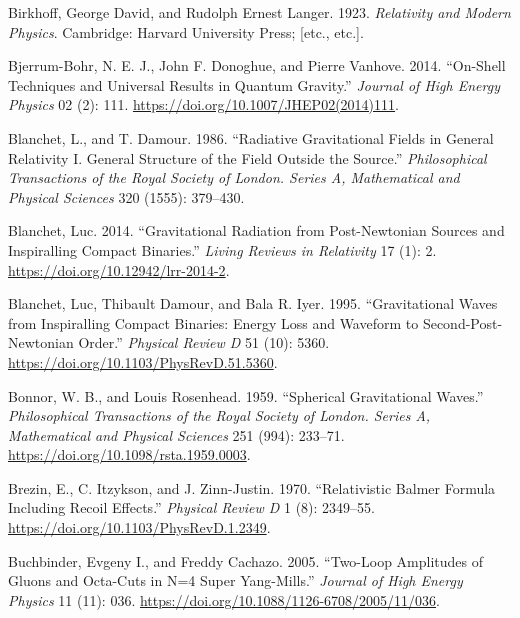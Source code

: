 \documentclass[
  11pt,
  a4paper,
  DIV=11,
  numbers=noendperiod,
  oneside]{scrreprt}
\newlength{\cslhangindent}
\newlength{\cslentryspacingunit} %
\newenvironment{CSLReferences}[2] %
 {%
  \setlength{\parindent}{0pt}
  \ifodd #1
  \let\oldpar\par
  \def\par{\hangindent=\cslhangindent\oldpar}
  \fi
  \setlength{\parskip}{#2\cslentryspacingunit}
 }%
 {}
\DeclareRobustCommand{\[}{\begin{equation}}
\DeclareRobustCommand{\]}{\end{equation}}
\begin{document}
\begin{CSLReferences}{1}{0}
\leavevmode{}%
Birkhoff, George David, and Rudolph Ernest Langer. 1923.
\emph{Relativity and Modern Physics}. {Cambridge}: {Harvard University
Press; {[}etc., etc.{]}}.

\leavevmode{}%
Bjerrum-Bohr, N. E. J., John F. Donoghue, and Pierre Vanhove. 2014.
{``On-Shell Techniques and Universal Results in Quantum Gravity.''}
\emph{Journal of High Energy Physics} 02 (2): 111.
\url{https://doi.org/10.1007/JHEP02(2014)111}.

\leavevmode{}%
Blanchet, L., and T. Damour. 1986. {``Radiative {Gravitational Fields}
in {General Relativity I}. {General Structure} of the {Field} Outside
the {Source}.''} \emph{Philosophical Transactions of the Royal Society
of London. Series A, Mathematical and Physical Sciences} 320 (1555):
379--430.

\leavevmode{}%
Blanchet, Luc. 2014. {``Gravitational {Radiation} from {Post-Newtonian
Sources} and {Inspiralling Compact Binaries}.''} \emph{Living Reviews in
Relativity} 17 (1): 2. \url{https://doi.org/10.12942/lrr-2014-2}.

\leavevmode{}%
Blanchet, Luc, Thibault Damour, and Bala R. Iyer. 1995. {``Gravitational
Waves from Inspiralling Compact Binaries: {Energy} Loss and Waveform to
Second-Post-{Newtonian} Order.''} \emph{Physical Review D} 51 (10):
5360. \url{https://doi.org/10.1103/PhysRevD.51.5360}.

\leavevmode{}%
Bonnor, W. B., and Louis Rosenhead. 1959. {``Spherical Gravitational
Waves.''} \emph{Philosophical Transactions of the Royal Society of
London. Series A, Mathematical and Physical Sciences} 251 (994):
233--71. \url{https://doi.org/10.1098/rsta.1959.0003}.

\leavevmode{}%
Brezin, E., C. Itzykson, and J. Zinn-Justin. 1970. {``Relativistic
{Balmer Formula Including Recoil Effects}.''} \emph{Physical Review D} 1
(8): 2349--55. \url{https://doi.org/10.1103/PhysRevD.1.2349}.

\leavevmode{}%
Buchbinder, Evgeny I., and Freddy Cachazo. 2005. {``Two-{Loop
Amplitudes} of {Gluons} and {Octa-Cuts} in {N}=4 {Super Yang-Mills}.''}
\emph{Journal of High Energy Physics} 11 (11): 036.
\url{https://doi.org/10.1088/1126-6708/2005/11/036}.


\end{CSLReferences}
\end{document}
